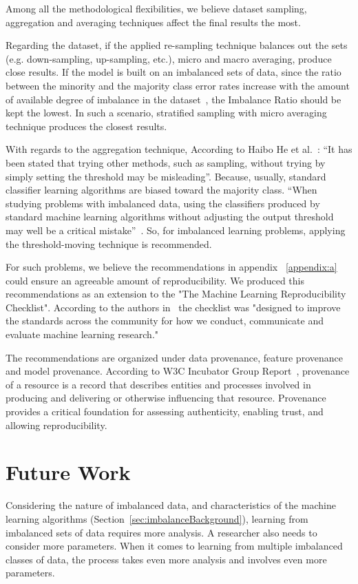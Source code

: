 Among all the methodological flexibilities, we believe dataset sampling, aggregation and 
averaging techniques affect the final results the most.

Regarding the dataset, if the applied re-sampling technique balances out the sets 
(e.g. down-sampling, up-sampling, etc.), micro and macro averaging, produce close results. 
If the model is built on an imbalanced sets of data, since the ratio between the minority and the 
majority class error rates increase with the amount of available degree of imbalance 
in the dataset~\cite{japkowicz_concept-learning_2001}, the Imbalance Ratio should be kept the lowest. 
In such a scenario, stratified sampling with micro averaging technique produces the closest results. 

With regards to the aggregation technique, According to Haibo He et al.~\cite{haibo_he_learning_2009}: 
“It has been stated that trying other methods, such as sampling, without trying by simply setting the 
threshold may be misleading”. Because, usually, standard classifier learning algorithms are 
biased toward the majority class. “When studying problems with imbalanced data, using the 
classifiers produced by standard machine learning algorithms without adjusting the output 
threshold may well be a critical mistake”~\cite{provost_machine_2000}. So, for imbalanced 
learning problems, applying the threshold-moving technique is recommended. 

For such problems, we believe the recommendations in appendix ~\ref{appendix:a} could ensure 
an agreeable amount of reproducibility. We produced this recommendations as an extension to 
the "The Machine Learning Reproducibility Checklist". According to the authors 
in~\cite{pineau_improving_2020} the checklist was "designed to improve the 
standards across the community for how we conduct, communicate and evaluate machine 
learning research."

The recommendations are organized under data provenance, feature provenance and 
model provenance. According to W3C Incubator Group Report~\cite{w3c}, 
provenance of a resource is a record that describes entities and processes involved in producing 
and delivering or otherwise influencing that resource. Provenance provides a critical foundation 
for assessing authenticity, enabling trust, and allowing reproducibility. 

\section{Future Work}
Considering the nature of imbalanced data, and characteristics of the machine learning 
algorithms (Section~\ref{sec:imbalanceBackground}), learning from imbalanced sets of data 
requires more analysis. A researcher also needs to consider more parameters. When it comes 
to learning from multiple imbalanced classes of data, the process takes even more analysis 
and involves even more parameters. 

